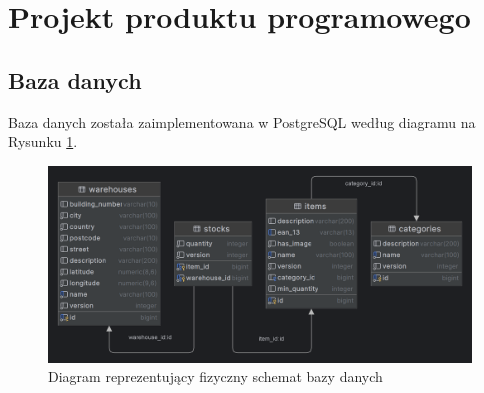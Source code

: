 \documentclass[../main.tex]{subfiles}
\begin{document}
\section{Projekt produktu programowego}
    \subsection{Baza danych}
        Baza danych została zaimplementowana w PostgreSQL według diagramu na Rysunku \ref{fig:db-diagram}.

        \begin{figure}[!ht]
            \centering
            \includegraphics[width=1.0\linewidth]{images/db-diagram.png}
            \caption{Diagram reprezentujący fizyczny schemat bazy danych}
            \label{fig:db-diagram}
        \end{figure}
\end{document}
